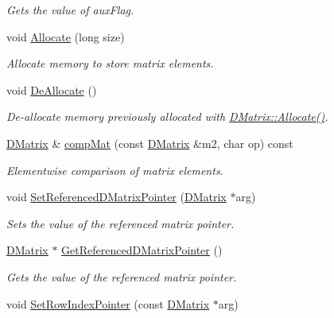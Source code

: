 \begin{DoxyCompactItemize}
\begin{DoxyCompactList}\small\item\em Gets the value of auxFlag. \item\end{DoxyCompactList}\item 
void \hyperlink{classDMatrix_ac643c444a18419885b5ac5a2f8d003be}{Allocate} (long size)
\begin{DoxyCompactList}\small\item\em Allocate memory to store matrix elements. \item\end{DoxyCompactList}\item 
void \hyperlink{classDMatrix_a077cd396523652629a258cb11f469886}{DeAllocate} ()
\begin{DoxyCompactList}\small\item\em De-\/allocate memory previously allocated with \hyperlink{classDMatrix_ac643c444a18419885b5ac5a2f8d003be}{DMatrix::Allocate()}. \item\end{DoxyCompactList}\item 
\hyperlink{classDMatrix}{DMatrix} \& \hyperlink{classDMatrix_a8935b0337db48a93dd91cb87c698b291}{compMat} (const \hyperlink{classDMatrix}{DMatrix} \&m2, char op) const 
\begin{DoxyCompactList}\small\item\em Elementwise comparison of matrix elements. \item\end{DoxyCompactList}\item 
void \hyperlink{classDMatrix_ac13795ccdc5f59c8bcec90207f484fe8}{SetReferencedDMatrixPointer} (\hyperlink{classDMatrix}{DMatrix} $\ast$arg)
\begin{DoxyCompactList}\small\item\em Sets the value of the referenced matrix pointer. \item\end{DoxyCompactList}\item 
\hyperlink{classDMatrix}{DMatrix} $\ast$ \hyperlink{classDMatrix_a9bb99d0f897fe9e23b5370e11bf80d3f}{GetReferencedDMatrixPointer} ()
\begin{DoxyCompactList}\small\item\em Gets the value of the referenced matrix pointer. \item\end{DoxyCompactList}\item 
void \hyperlink{classDMatrix_a73b829dadf5b159839b57a399f1fa8c8}{SetRowIndexPointer} (const \hyperlink{classDMatrix}{DMatrix} $\ast$arg)

\end{DoxyCompactItemize}
